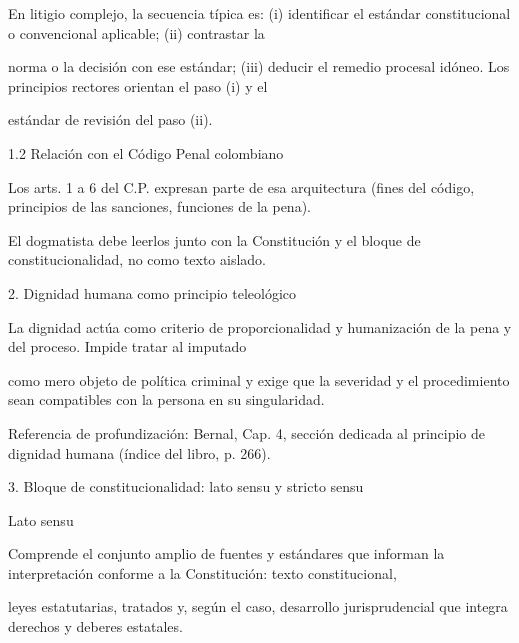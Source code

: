 \documentclass[11pt,a4paper]{article}
\begin{document}
          En litigio complejo, la secuencia típica es: (i) identificar el estándar constitucional o convencional aplicable; (ii) contrastar la\par
          norma o la decisión con ese estándar; (iii) deducir el remedio procesal idóneo. Los principios rectores orientan el paso (i) y el\par
          estándar de revisión del paso (ii).\par




        1.2 Relación con el Código Penal colombiano\par

          Los arts. 1 a 6 del C.P. expresan parte de esa arquitectura (fines del código, principios de las sanciones, funciones de la pena).\par
          El dogmatista debe leerlos junto con la Constitución y el bloque de constitucionalidad, no como texto aislado.\par






      2. Dignidad humana como principio teleológico\par


        La dignidad actúa como criterio de proporcionalidad y humanización de la pena y del proceso. Impide tratar al imputado\par
        como mero objeto de política criminal y exige que la severidad y el procedimiento sean compatibles con la persona en su singularidad.\par



        Referencia de profundización: Bernal, Cap. 4, sección dedicada al principio de dignidad humana (índice del libro, p. 266).\par





      3. Bloque de constitucionalidad: lato sensu y stricto sensu\par



          Lato sensu\par


            Comprende el conjunto amplio de fuentes y estándares que informan la interpretación conforme a la Constitución: texto constitucional,\par
            leyes estatutarias, tratados y, según el caso, desarrollo jurisprudencial que integra derechos y deberes estatales.\par
\end{document}
